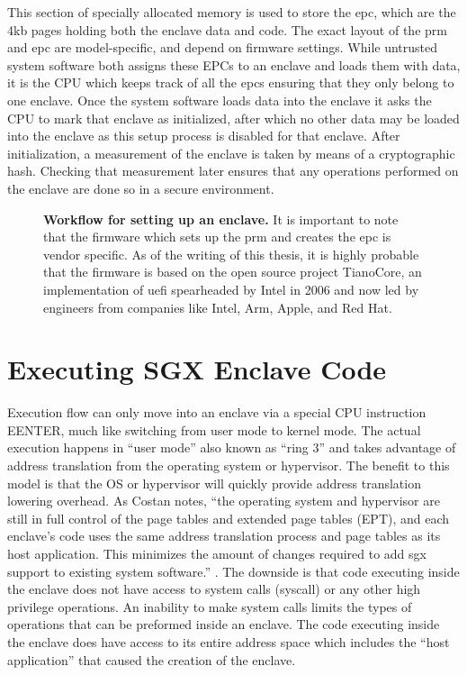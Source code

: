 This section of specially allocated memory is used to store the \gls{epc}, which are the 4kb pages holding both the enclave data and code. The exact layout of the \gls{prm} and \gls{epc} are model-specific, and depend on firmware settings. While untrusted system software both assigns these EPCs to an enclave and loads them with data, it is the CPU which keeps track of all the \gls{epc}s ensuring that they only belong to one enclave. Once the system software loads data into the enclave it asks the CPU to mark that enclave as initialized, after which no other data may be loaded into the enclave as this setup process is disabled for that enclave. After initialization, a \gls{measurement} of the enclave is taken by means of a cryptographic hash. Checking that \gls{measurement} later ensures that any operations performed on the enclave are done so in a secure environment.

\begin{figure}[hb]
\centering

\caption[Setting Up Intel SGX]{\textbf{Workflow for setting up an enclave.} It is important to note that the firmware which sets up the \gls{prm} and creates the \gls{epc} is vendor specific. As of the writing of this thesis, it is highly probable that the firmware is based on the open source project TianoCore, an implementation of \gls{uefi} spearheaded by Intel in 2006 and now led by engineers from companies like Intel, Arm, Apple, and Red Hat.}
\label{fig:sgx-setup}
\end{figure}

\section{Executing SGX Enclave Code}
Execution flow can only move into an enclave via a special CPU instruction EENTER, much like switching from user mode to kernel mode. The actual execution happens in ``user mode'' also known as ``\gls{ring} 3'' and takes advantage of address translation from the operating system or hypervisor. The benefit to this model is that the OS or hypervisor will quickly provide address translation lowering overhead. As Costan notes, ``the operating system and hypervisor are still in full control of the page tables and extended page tables (EPT), and each enclave's code uses the same address translation process and page tables as its host application. This minimizes the amount of changes required to add \gls{sgx} support to existing system software.'' \cite{Costan2016}. The downside is that code executing inside the enclave does not have access to system calls (syscall) or any other high privilege operations. An inability to make system calls limits the types of operations that can be preformed inside an enclave. The code executing inside the enclave does have access to its entire address space which includes the ``host application'' that caused the creation of the enclave.

